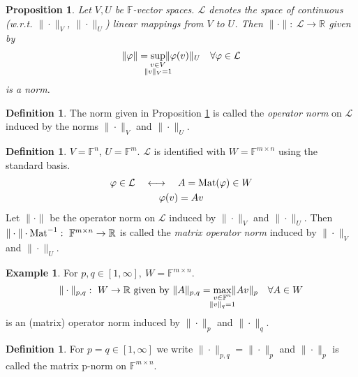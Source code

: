 \documentclass[12pt]{article}
\newtheorem{proposition}[theorem]{Proposition}
\theoremstyle{definition}
\newtheorem{definition}[theorem]{Definition}
\newtheorem{example}[theorem]{Example}
\theoremstyle{remark}
\numberwithin{equation}{section}
\newcommand{\F}{\mathbb{F}}
\newcommand{\R}{\mathbb{R}}
\newcommand{\normempty}{\|\cdot\|}
\DeclarePairedDelimiter{\norm}{\lVert}{\rVert}
\begin{document}
\begin{proposition}\label{prop:opnorm-is-norm}
  Let $V,U$ be $\F$-vector spaces. $\mathcal{L}$ denotes the space of continuous (w.r.t. $\normempty_V$, $\normempty_U$) linear mappings from $V$ to $U$. Then $\normempty:\ \mathcal{L} \rightarrow \R$ given by
  \begin{equation*}
    \norm{\varphi} = \sup_{\mathclap{\substack{v \in V \\ \norm{v}_V=1}}} \norm{\varphi(v)}_U \quad \forall \varphi \in \mathcal{L}
  \end{equation*}
  is a norm.
\end{proposition}
\begin{definition}
  The norm given in Proposition \ref{prop:opnorm-is-norm} is called the \emph{operator norm} on $\mathcal{L}$ induced by the norms $\normempty_V$ and $\normempty_U$.
\end{definition}
\begin{definition}
  $V=\F^n$, $U=\F^m$. $\mathcal{L}$ is identified with $W=\F^{m\times n}$ using the standard basis.
  \begin{gather*}
    \varphi \in \mathcal{L} \quad \longleftrightarrow \quad A = \textnormal{Mat}(\varphi) \in W \\
    \varphi(v) = Av
  \end{gather*}
  Let $\normempty$ be the operator norm on $\mathcal{L}$ induced by $\normempty_V$ and $\normempty_U$. Then $\normempty \cdot \textnormal{Mat}^{-1}:\ \F^{m \times n} \rightarrow \R$ is called the \emph{matrix operator norm} induced by $\normempty_V$ and $\normempty_U$.
\end{definition}

\begin{example}
  For $p,q \in [1,\infty],\ W=\F^{m\times n}$.
  \begin{equation*}
    \normempty_{p,q}:\ W \rightarrow \R\text{ given by }\norm{A}_{p,q} = \max_{\mathclap{\substack{v \in \F^n \\ \norm{v}_q=1}}} \norm{Av}_p \quad \forall A \in W
  \end{equation*}
  is an (matrix) operator norm induced by $\normempty_p$ and $\normempty_q$.
\end{example}

\begin{definition}
  For $p=q \in [1,\infty]$ we write $\normempty_{p,q} = \normempty_p$ and $\normempty_p$ is called the matrix p-norm on $\F^{m\times n}$.
\end{definition}
\end{document}
